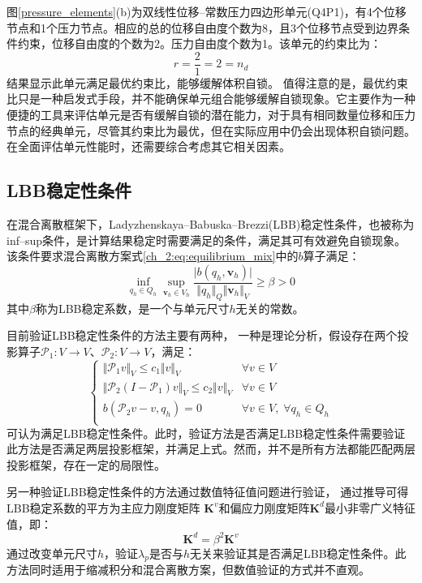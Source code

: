 图\ref{pressure_elements}(b)为双线性位移--常数压力四边形单元(Q4P1)，有4个位移节点和1个压力节点。相应的总的位移自由度个数为8，且3个位移节点受到边界条件约束，位移自由度的个数为$2$。压力自由度个数为1。该单元的约束比为：
\begin{equation}
    r=\frac{2}{1}=2 = n_d
\end{equation}
结果显示此单元满足最优约束比，能够缓解体积自锁。
值得注意的是，最优约束比只是一种启发式手段，并不能确保单元组合能够缓解自锁现象。它主要作为一种便捷的工具来评估单元是否有缓解自锁的潜在能力，对于具有相同数量位移和压力节点的经典单元，尽管其约束比为最优，但在实际应用中仍会出现体积自锁问题。在全面评估单元性能时，还需要综合考虑其它相关因素。

\subsection{LBB稳定性条件}
在混合离散框架下，Ladyzhenskaya--Babuska--Brezzi(LBB)稳定性条件，也被称为inf--sup条件\cite{babuska1997a,bathe1996}，是计算结果稳定时需要满足的条件，满足其可有效避免自锁现象。该条件要求混合离散方案式\eqref{ch_2:eq:equilibrium_mix}中的$b$算子满足：
\begin{equation}\label{ch:2:eq:LBB}
    \inf_{q_h \in Q_h} \sup_{\boldsymbol v_h \in V_h} \frac{\vert b(q_h,\boldsymbol v_h) \vert}{\Vert q_h \Vert_Q \Vert \boldsymbol v_h \Vert_V} \ge \beta > 0
\end{equation}
其中$\beta$称为LBB稳定系数，是一个与单元尺寸$h$无关的常数。

目前验证LBB稳定性条件的方法主要有两种，
一种是理论分析\cite{brezzi1991}，假设存在两个投影算子$\mathcal P_1:V\rightarrow V$、$\mathcal P_2:V\rightarrow V$，满足：
\begin{equation}\label{analy}
    \begin{cases}
        \Vert\mathcal P_1 v\Vert_V \le c_1\Vert v\Vert_V & \forall v \in V \\
        \Vert \mathcal P_2(I-\mathcal P_1)v \Vert_V \le c_2 \Vert v\Vert_V & \forall v \in V \\
        b(\mathcal P_2v -v,q_h)=0 & \forall v \in V,\; \forall q_h \in Q_h\\
    \end{cases}
\end{equation}
可认为满足LBB稳定性条件。此时，验证方法是否满足LBB稳定性条件需要验证此方法是否满足两层投影框架，并满足上式。然而，并不是所有方法都能匹配两层投影框架，存在一定的局限性。

另一种验证LBB稳定性条件的方法通过数值特征值问题进行验证\cite{chapelle1993}，
通过推导可得LBB稳定系数的平方为主应力刚度矩阵 $\boldsymbol K^v$和偏应力刚度矩阵$ \boldsymbol K^d$最小非零广义特征值，即：
\begin{equation}\label{ch_2:eq:eigenvalue}
    \boldsymbol K^d = \beta^2 \boldsymbol K^v
\end{equation}
通过改变单元尺寸$h$，验证$\lambda_p$是否与$h$无关来验证其是否满足LBB稳定性条件。此方法同时适用于缩减积分和混合离散方案，但数值验证的方式并不直观。

